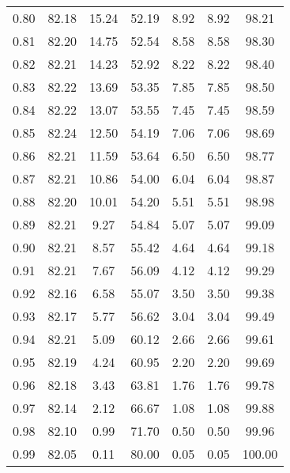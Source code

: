 \begin{tabular}{|c|c|c|c|c|c|c|}
      0.80 &     82.18 &     15.24 &      52.19 &    8.92 &       8.92 &         98.21 \\
      0.81 &     82.20 &     14.75 &      52.54 &    8.58 &       8.58 &         98.30 \\
      0.82 &     82.21 &     14.23 &      52.92 &    8.22 &       8.22 &         98.40 \\
      0.83 &     82.22 &     13.69 &      53.35 &    7.85 &       7.85 &         98.50 \\
      0.84 &     82.22 &     13.07 &      53.55 &    7.45 &       7.45 &         98.59 \\
      0.85 &     82.24 &     12.50 &      54.19 &    7.06 &       7.06 &         98.69 \\
      0.86 &     82.21 &     11.59 &      53.64 &    6.50 &       6.50 &         98.77 \\
      0.87 &     82.21 &     10.86 &      54.00 &    6.04 &       6.04 &         98.87 \\
      0.88 &     82.20 &     10.01 &      54.20 &    5.51 &       5.51 &         98.98 \\
      0.89 &     82.21 &      9.27 &      54.84 &    5.07 &       5.07 &         99.09 \\
      0.90 &     82.21 &      8.57 &      55.42 &    4.64 &       4.64 &         99.18 \\
      0.91 &     82.21 &      7.67 &      56.09 &    4.12 &       4.12 &         99.29 \\
      0.92 &     82.16 &      6.58 &      55.07 &    3.50 &       3.50 &         99.38 \\
      0.93 &     82.17 &      5.77 &      56.62 &    3.04 &       3.04 &         99.49 \\
      0.94 &     82.21 &      5.09 &      60.12 &    2.66 &       2.66 &         99.61 \\
      0.95 &     82.19 &      4.24 &      60.95 &    2.20 &       2.20 &         99.69 \\
      0.96 &     82.18 &      3.43 &      63.81 &    1.76 &       1.76 &         99.78 \\
      0.97 &     82.14 &      2.12 &      66.67 &    1.08 &       1.08 &         99.88 \\
      0.98 &     82.10 &      0.99 &      71.70 &    0.50 &       0.50 &         99.96 \\
      0.99 &     82.05 &      0.11 &      80.00 &    0.05 &       0.05 &        100.00 \\
\bottomrule
\end{tabular}
